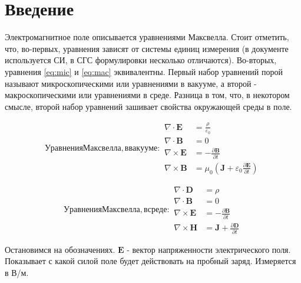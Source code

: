 \documentclass[a4paper,12pt]{article}
\numberwithin{equation}{section}
\begin{document}
\sloppy






\tableofcontents




\section{Введение}

Электромагнитное поле описывается уравнениями Максвелла.
Стоит отметить, что, во-первых, уравнения зависят от системы единиц измерения (в документе используется СИ, в СГС формулировки несколько отличаются).
Во-вторых, уравнения \ref{eq:mic} и \ref{eq:mac} эквивалентны.
Первый набор уравнений порой называют микроскопическими или уравнениями в вакууме, а второй - макроскопическими или уравнениями в среде.
Разница в том, что, в некотором смысле, второй набор уравнений зашивает свойства окружающей среды в поле.

\begin{subequations}
\label{eq:mic}
Уравнения Максвелла, в вакууме:
\begin{align}
        \nabla \cdot \bm{E} &= \frac{\rho}{\varepsilon_0} \label{eq:mica} \\
        \nabla \cdot \bm{B} &= 0 \label{eq:micb} \\
        \nabla \times \bm{E} &= -\frac{\partial{\bm{B}}}{\partial{t}} \label{eq:micc} \\
        \nabla \times \bm{B} &= \mu_0 \left(\bm{J} +\varepsilon_0 \frac{\partial{\bm{E}}}{\partial{t}}\right) \label{eq:micd}
\end{align}
\end{subequations}

\begin{subequations}
\label{eq:mac}
Уравнения Максвелла, в среде:
\begin{align}
        \nabla \cdot \bm{D} &= \rho \label{eq:maca} \\
        \nabla \cdot \bm{B} &= 0 \label{eq:macb} \\
        \nabla \times \bm{E} &= -\frac{\partial{\bm{B}}}{\partial{t}} \label{eq:macc} \\
        \nabla \times \bm{H} &= \bm{J} + \frac{\partial{\bm{D}}}{\partial{t}}\label{eq:macd}
\end{align}
\end{subequations}

Остановимся на обозначениях.
$\bm{E}$ - вектор напряженности электрического поля.
Показывает с какой силой поле будет действовать на пробный заряд.
Измеряется в В/м.
\end{document}
